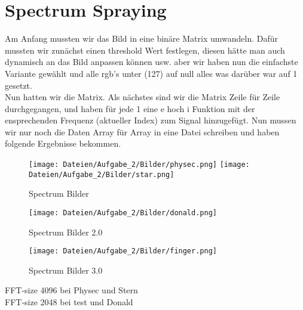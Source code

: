 \documentclass[12pt,a4paper]{article}
\begin{document}
\section{Spectrum Spraying}
Am Anfang mussten wir das Bild in eine binäre Matrix umwandeln. Dafür mussten wir zunächst einen threshold Wert festlegen, diesen hätte man auch dynamisch an das Bild anpassen können usw. aber wir haben nun die einfachste Variante gewählt und alle rgb's unter (127) auf null alles was darüber war auf 1 gesetzt. \\
Nun hatten wir die Matrix. Als nächstes sind wir die Matrix Zeile für Zeile durchgegangen, und haben für jede 1 eine e hoch i Funktion mit der ensprechenden Frequenz (aktueller Index) zum Signal hinzugefügt. Nun mussen wir nur noch die Daten Array für Array in eine Datei schreiben und haben folgende Ergebnisse bekommen. \\
\begin{figure}[H]
\centering
\texttt{[image: Dateien/Aufgabe\_2/Bilder/physec.png]} 
\texttt{[image: Dateien/Aufgabe\_2/Bilder/star.png]} 
\caption{Spectrum Bilder}
\label{fig:2_1}
\end{figure}
\begin{figure}[H]
\centering
\texttt{[image: Dateien/Aufgabe\_2/Bilder/donald.png]} 
\caption{Spectrum Bilder 2.0}
\label{fig:2_2}
\end{figure}
\begin{figure}[H]
\centering
\texttt{[image: Dateien/Aufgabe\_2/Bilder/finger.png]} 
\caption{Spectrum Bilder 3.0}
\label{fig:2_3}
\end{figure}
FFT-size 4096 bei Physec und Stern\\
FFT-size 2048 bei test und Donald\\
\end{document}
